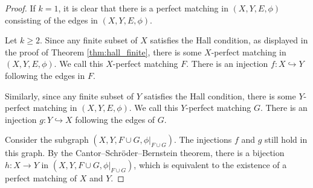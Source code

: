 \documentclass[10pt]{mypackage2}
\begin{document}
\begin{proof}
  If $k = 1$, it is clear that there is a perfect matching in $\left(X,Y,E,\phi\right)$ consisting of the edges in $\left(X,Y,E,\phi\right)$.\newline

  Let $k\geq 2$. Since any finite subset of $X$ satisfies the Hall condition, as displayed in the proof of Theorem \ref{thm:hall_finite}, there is some $X$-perfect matching in $\left(X,Y,E,\phi\right)$. We call this $X$-perfect matching $F$. There is an injection $f\colon X\hookrightarrow Y$ following the edges in $F$.\newline

  Similarly, since any finite subset of $Y$ satisfies the Hall condition, there is some $Y$-perfect matching in $\left(X,Y,E,\phi\right)$. We call this $Y$-perfect matching $G$. There is an injection $g\colon Y\hookrightarrow X$ following the edges of $G$.\break

  Consider the subgraph $\left(X,Y,F\cup G,\phi|_{F\cup G}\right)$. The injections $f$ and $g$ still hold in this graph. By the Cantor--Schröder--Bernstein theorem, there is a bijection $h\colon X\rightarrow Y$ in $\left(X,Y,F\cup G,\phi|_{F\cup G}\right)$, which is equivalent to the existence of a perfect matching of $X$ and $Y$.
\end{proof}
\end{document}
